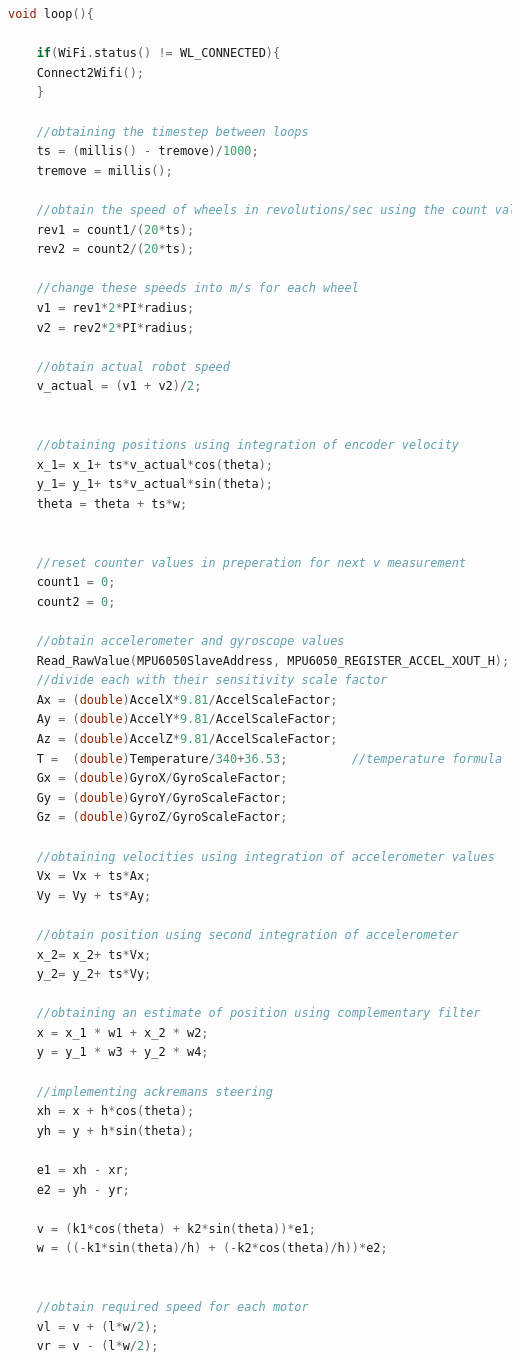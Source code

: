 \documentclass[conference]{IEEEtran}
\begin{document}
\begin{lstlisting}[language=C++, caption=Robot Code]
void loop(){

    if(WiFi.status() != WL_CONNECTED){
    Connect2Wifi();
    }

    //obtaining the timestep between loops
    ts = (millis() - tremove)/1000;
    tremove = millis();
    
    //obtain the speed of wheels in revolutions/sec using the count values from the interrupt functions 
    rev1 = count1/(20*ts);
    rev2 = count2/(20*ts);

    //change these speeds into m/s for each wheel
    v1 = rev1*2*PI*radius;
    v2 = rev2*2*PI*radius;

    //obtain actual robot speed
    v_actual = (v1 + v2)/2;

    
    //obtaining positions using integration of encoder velocity 
    x_1= x_1+ ts*v_actual*cos(theta);
    y_1= y_1+ ts*v_actual*sin(theta);
    theta = theta + ts*w;
    
    
    //reset counter values in preperation for next v measurement
    count1 = 0;
    count2 = 0;
    
    //obtain accelerometer and gyroscope values 
    Read_RawValue(MPU6050SlaveAddress, MPU6050_REGISTER_ACCEL_XOUT_H);
    //divide each with their sensitivity scale factor
    Ax = (double)AccelX*9.81/AccelScaleFactor;
    Ay = (double)AccelY*9.81/AccelScaleFactor;
    Az = (double)AccelZ*9.81/AccelScaleFactor;
    T =  (double)Temperature/340+36.53;         //temperature formula
    Gx = (double)GyroX/GyroScaleFactor;
    Gy = (double)GyroY/GyroScaleFactor;
    Gz = (double)GyroZ/GyroScaleFactor;

    //obtaining velocities using integration of accelerometer values
    Vx = Vx + ts*Ax;
    Vy = Vy + ts*Ay;

    //obtain position using second integration of accelerometer
    x_2= x_2+ ts*Vx;
    y_2= y_2+ ts*Vy;

    //obtaining an estimate of position using complementary filter  
    x = x_1 * w1 + x_2 * w2;
    y = y_1 * w3 + y_2 * w4;
    
    //implementing ackremans steering
    xh = x + h*cos(theta);
    yh = y + h*sin(theta);

    e1 = xh - xr;
    e2 = yh - yr;

    v = (k1*cos(theta) + k2*sin(theta))*e1;
    w = ((-k1*sin(theta)/h) + (-k2*cos(theta)/h))*e2;


    //obtain required speed for each motor
    vl = v + (l*w/2);
    vr = v - (l*w/2);


\end{lstlisting}
\end{document}
